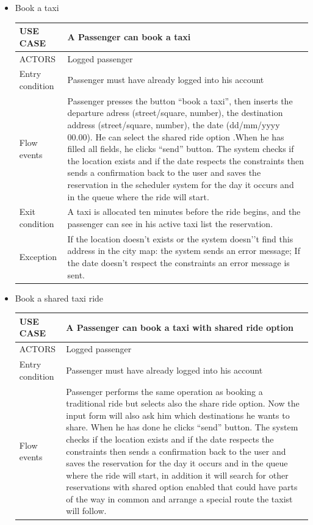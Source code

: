 \begin{itemize}
\begin{center}
\begin{figure} [h]
	\end{figure}
	\end{center}
	\newpage 
\item Book a taxi
	\begin{center}
   	 \begin{tabular}{ | l | p{11cm} |}
   	 \hline
   	USE CASE & A Passenger can book a taxi \\ \hline
   	 ACTORS & Logged passenger \\ \hline
    	 Entry condition & Passenger must have already logged into his account\\ \hline
    	 Flow events & Passenger presses the button “book a taxi”, then inserts the departure adress (street/square, number), the destination address (street/square, number), the date (dd/mm/yyyy 00.00). He can select the shared ride option .When he has filled all fields, he clicks “send” button. The system checks if the location exists and if the date respects the constraints then sends a confirmation back to the user and saves the reservation in the scheduler system for the day it occurs and in the queue where the ride will start.\\ \hline
  	   Exit condition & A taxi is allocated ten minutes before the ride begins, and the passenger can see in his active taxi list the reservation.\\ \hline
  	   Exception &  If the location doesn’t exists or the system doesn’’t find this address in the city map: the system sends an error message;
If the date doesn’t respect the constraints an error message is sent.\\ \hline
    \end{tabular}
\end{center}
\item Book a shared taxi ride
	\begin{center}
   	 \begin{tabular}{ | l | p{11cm} |}
   	 \hline
   	USE CASE & A Passenger can book a taxi with shared ride option\\ \hline
   	 ACTORS & Logged passenger \\ \hline
    	 Entry condition & Passenger must have already logged into his account \\ \hline
    	 Flow events & Passenger performs the same operation as booking a traditional ride but selects also the share ride option. Now the input form will also ask him which destinations he wants to share. When he has done he clicks “send” button. The system checks if the location exists and if the date respects the constraints then sends a confirmation back to the user and saves the reservation for the day it occurs and in the queue where the ride will start, in addition it will search for other reservations with shared option enabled that could have parts of the way in common and arrange a special route the taxist will follow.\\ \hline

\end{tabular}
\end{center}
\end{itemize}

